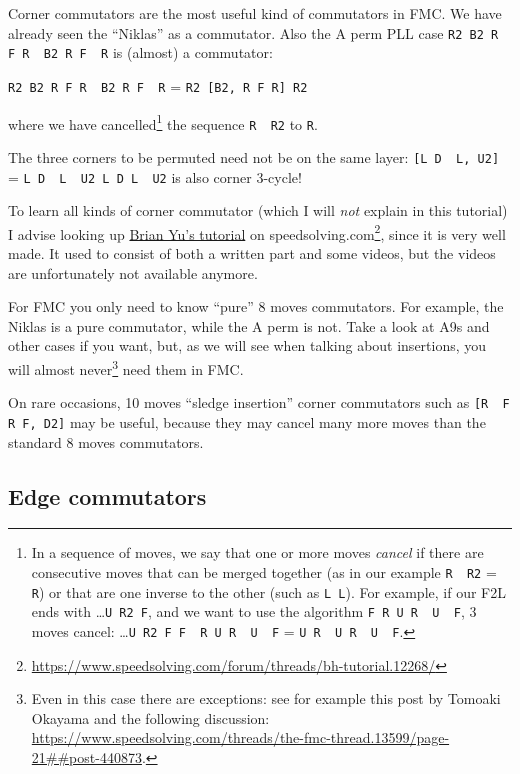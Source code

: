 \documentclass[11pt,a4paper]{book}
\newcommand{\p}{\textquotesingle}
\newcommand{\m}{\texttt}
\newcommand{\ps}{\p\,\,}
\begin{document}
Corner commutators are the most useful kind of commutators in FMC. We have already seen the ``Niklas'' as a commutator. Also the A perm PLL case \m{R2 B2 R F R\ps B2 R F\ps R} is (almost) a commutator:

\begin{center}
\m{R2 B2 R F R\ps B2 R F\ps R} = \m{R2 [B2, R F R\p] R2}
\end{center}

where we have cancelled\footnote{In a sequence of moves, we say that one or more moves \emph{cancel} if there are consecutive moves that can be merged together (as in our example \m{R\ps R2} = \m R) or that are one inverse to the other (such as \m{L L\p}). For example, if our F2L ends with \dots\m{U R2 F\p}, and we want to use the algorithm \m{F R U R\ps U\ps F\p}, 3 moves cancel:
\dots\m{U R2 F F\ps R U R\ps U\ps F\p} = \m{U R\ps U R\ps U\ps F\p}.} the sequence \m{R\ps R2} to \m R.

The three corners to be permuted need not be on the same layer: \m{[L D\ps L\p, U2]} = \m{L D\ps L\ps U2 L D L\ps U2} is also corner 3-cycle!

To learn all kinds of corner commutator (which I will \emph{not} explain in this tutorial) I advise looking up \href{https://www.speedsolving.com/forum/threads/bh-tutorial.12268/}{Brian Yu's tutorial} on speedsolving.com\footnote{\url{https://www.speedsolving.com/forum/threads/bh-tutorial.12268/}}, since it is very well made. It used to consist of both a written part and some videos, but the videos are unfortunately not available anymore.

For FMC you only need to know ``pure'' 8 moves commutators. For example, the Niklas is a pure commutator, while the A perm is not. Take a look at A9s and other cases if you want, but, as we will see when talking about insertions, you will almost never\footnote{Even in this case there are exceptions: see for example this post by Tomoaki Okayama and the following discussion: \url{https://www.speedsolving.com/threads/the-fmc-thread.13599/page-21##post-440873}.} need them in FMC.

On rare occasions, 10 moves ``sledge insertion'' corner commutators such as \m{[R\ps F R F\p, D2]} may be useful, because they may cancel many more moves than the standard 8 moves commutators.

\subsection{Edge commutators}
\end{document}
